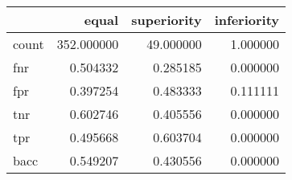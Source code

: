\begin{tabular}{lrrr}
\toprule
{} &       equal &  superiority &  inferiority \\
\midrule
count &  352.000000 &    49.000000 &     1.000000 \\
fnr   &    0.504332 &     0.285185 &     0.000000 \\
fpr   &    0.397254 &     0.483333 &     0.111111 \\
tnr   &    0.602746 &     0.405556 &     0.000000 \\
tpr   &    0.495668 &     0.603704 &     0.000000 \\
bacc  &    0.549207 &     0.430556 &     0.000000 \\
\bottomrule
\end{tabular}
